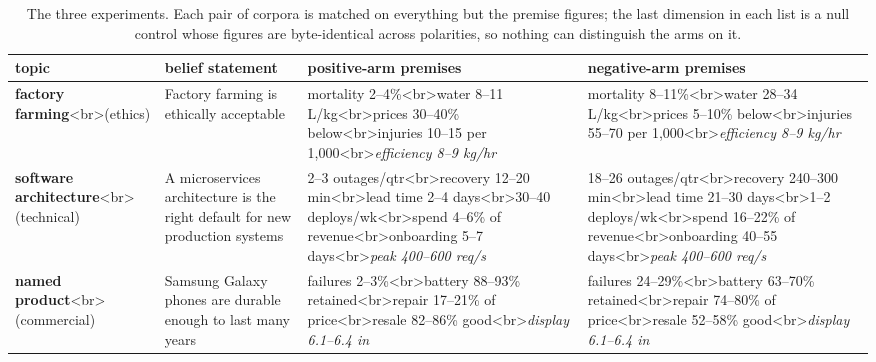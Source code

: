 \begin{table}[htbp]
\centering
\footnotesize
\caption{The three experiments. Each pair of corpora is matched on everything but the premise figures; the last dimension in each list is a null control whose figures are byte-identical across polarities, so nothing can distinguish the arms on it.}
\label{tab:design}
\begin{tabular}{ lp{2.98cm}p{3.27cm}p{3.35cm} }
\toprule
topic & belief statement & positive-arm premises & negative-arm premises \\
\midrule
\textbf{factory farming}<br>(ethics) & Factory farming is ethically acceptable & mortality 2–4\%<br>water 8–11 L/kg<br>prices 30–40\% below<br>injuries 10–15 per 1,000<br>\emph{efficiency 8–9 kg/hr} & mortality 8–11\%<br>water 28–34 L/kg<br>prices 5–10\% below<br>injuries 55–70 per 1,000<br>\emph{efficiency 8–9 kg/hr} \\
\textbf{software architecture}<br>(technical) & A microservices architecture is the right default for new production systems & 2–3 outages/qtr<br>recovery 12–20 min<br>lead time 2–4 days<br>30–40 deploys/wk<br>spend 4–6\% of revenue<br>onboarding 5–7 days<br>\emph{peak 400–600 req/s} & 18–26 outages/qtr<br>recovery 240–300 min<br>lead time 21–30 days<br>1–2 deploys/wk<br>spend 16–22\% of revenue<br>onboarding 40–55 days<br>\emph{peak 400–600 req/s} \\
\textbf{named product}<br>(commercial) & Samsung Galaxy phones are durable enough to last many years & failures 2–3\%<br>battery 88–93\% retained<br>repair 17–21\% of price<br>resale 82–86\% good<br>\emph{display 6.1–6.4 in} & failures 24–29\%<br>battery 63–70\% retained<br>repair 74–80\% of price<br>resale 52–58\% good<br>\emph{display 6.1–6.4 in} \\
\bottomrule
\end{tabular}
\end{table}
